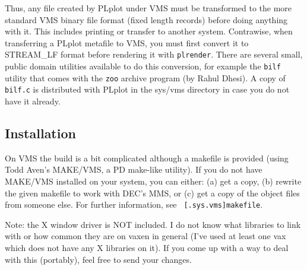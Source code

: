 Thus, any file created by PLplot under VMS must be transformed to the more
standard VMS binary file format (fixed length records) before doing anything
with it.  This includes printing or transfer to another system.  Contrawise,
when transferring a PLplot metafile to VMS, you must first convert it to
STREAM\_LF format before rendering it with {\tt plrender}.  There are
several small, public domain utilities available to do this conversion, for
example the {\tt bilf} utility that comes with the {\tt zoo} archive program
(by Rahul Dhesi).  A copy of {\tt bilf.c} is distributed with PLplot in the
sys/vms directory in case you do not have it already.

\subsection{Installation}

On VMS the build is a bit complicated although a makefile is provided
(using Todd Aven's MAKE/VMS, a PD make-like utility).  If you do not have
MAKE/VMS installed on your system, you can either: (a) get a copy, (b)
rewrite the given makefile to work with DEC's MMS, or (c) get a copy of the
object files from someone else.  For further information, see {\tt
[.sys.vms]makefile}. 

Note: the X window driver is NOT included.  I do not know what libraries to
link with or how common they are on vaxen in general (I've used at least
one vax which does not have any X libraries on it).  If you come up with a
way to deal with this (portably), feel free to send your changes. 
